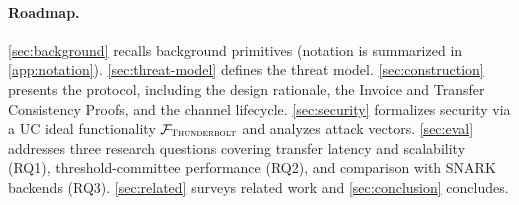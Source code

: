 

\paragraph{Roadmap.} \autoref{sec:background} recalls background primitives (notation is summarized in \autoref{app:notation}). \autoref{sec:threat-model} defines the threat model. \autoref{sec:construction} presents the protocol, including the design rationale, the Invoice and Transfer Consistency Proofs, and the channel lifecycle. \autoref{sec:security} formalizes security via a UC ideal functionality $\mathcal{F}_{\textsc{Thunderbolt}}$ and analyzes attack vectors. \autoref{sec:eval} addresses three research questions covering transfer latency and scalability (RQ1), threshold-committee performance (RQ2), and comparison with SNARK backends (RQ3). \autoref{sec:related} surveys related work and \autoref{sec:conclusion} concludes.
